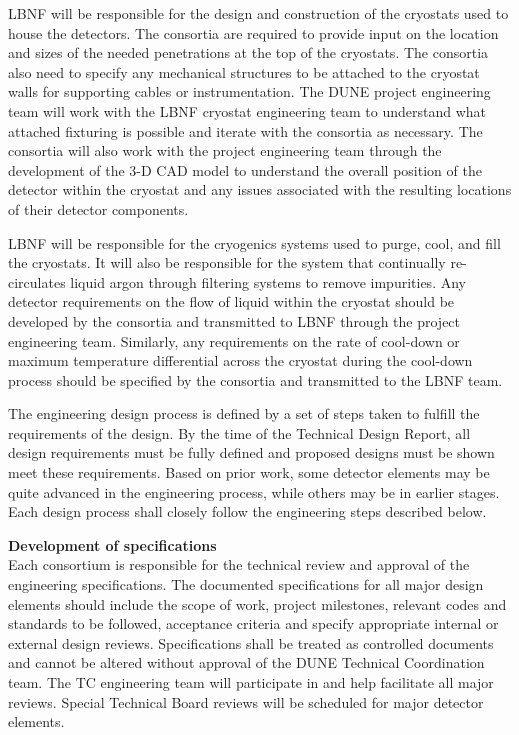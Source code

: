 LBNF will be responsible for the design and construction of the
cryostats used to house the detectors.  The consortia are required to
provide input on the location and sizes of the needed penetrations at
the top of the cryostats.  The consortia also need to specify any
mechanical structures to be attached to the cryostat walls for
supporting cables or instrumentation.  The DUNE project engineering
team will work with the LBNF cryostat engineering team to understand
what attached fixturing is possible and iterate with the consortia as
necessary.  The consortia will also work with the project engineering
team through the development of the 3-D CAD model to understand the
overall position of the detector within the cryostat and any issues
associated with the resulting locations of their detector components.

LBNF will be responsible for the cryogenics systems used to purge,
cool, and fill the cryostats.  It will also be responsible for the
system that continually re-circulates liquid argon through filtering
systems to remove impurities.  Any detector requirements on the flow
of liquid within the cryostat should be developed by the consortia and
transmitted to LBNF through the project engineering team.  Similarly,
any requirements on the rate of cool-down or maximum temperature
differential across the cryostat during the cool-down process should
be specified by the consortia and transmitted to the LBNF team.



\label{ssec:fdsp-coord-integ-eng-processes}

The engineering design process is defined by a set of steps taken to
fulfill the requirements of the design.  By the time of the Technical
Design Report, all design requirements must be fully defined and
proposed designs must be shown meet these requirements.  Based on
prior work, some detector elements may be quite advanced in the
engineering process, while others may be in earlier stages.  Each
design process shall closely follow the engineering steps described
below.


{\bf Development of specifications}\\
Each consortium is responsible for the technical review and approval
of the engineering specifications.  The documented specifications for
all major design elements should include the scope of work, project
milestones, relevant codes and standards to be followed, acceptance
criteria and specify appropriate internal or external design reviews.
Specifications shall be treated as controlled documents and cannot be
altered without approval of the DUNE Technical Coordination team.  The
TC engineering team will participate in and help facilitate all
major reviews.  Special Technical Board reviews will be scheduled for
major detector elements.

